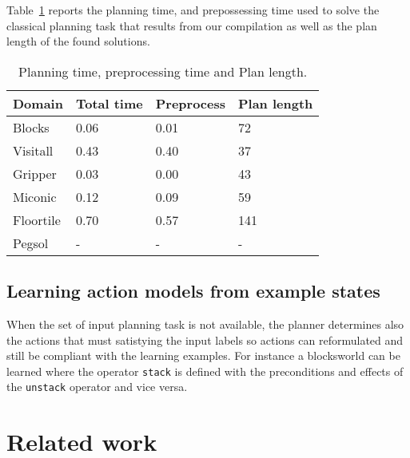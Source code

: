 \documentclass[letterpaper]{article} %
\begin{document}
Table~\ref{tab:time_plans} reports the planning time, and prepossessing time used to solve the classical planning task that results from our compilation as well as the plan length of the found solutions. 	

\begin{table}[hbt!]
	\begin{center}
		\begin{tabular}{l|l|l|l|}			 
			Domain & Total time & Preprocess & Plan length  \\
			\hline
			Blocks & 0.06 & 0.01 & 72  \\
			Visitall & 0.43 & 0.40 & 37 \\
			Gripper & 0.03 & 0.00 & 43  \\
			Miconic & 0.12 & 0.09 & 59  \\
			Floortile & 0.70 & 0.57 & 141 \\
			Pegsol & - & - & - \\
		\end{tabular}
	\end{center}
	\caption{Planning time, preprocessing time and Plan length.}
	\label{tab:time_plans}	
\end{table}


\subsection{Learning action models from example states}
When the set of input planning task is not available, the planner determines also the actions that must satistying the input labels so actions can reformulated and still be compliant with the learning examples. For instance a blocksworld can be learned where the operator {\small\tt stack} is defined with the preconditions and effects of the {\small\tt unstack} operator and vice versa. 








\section{Related work}
\end{document}
